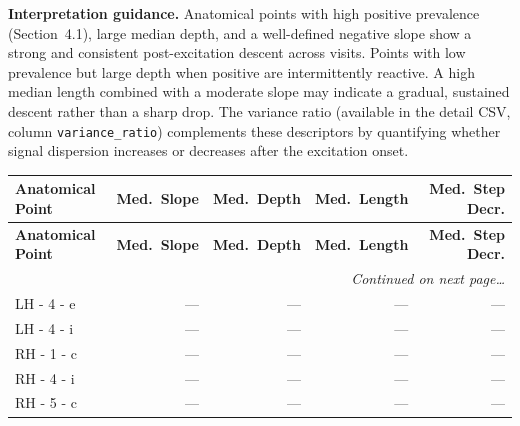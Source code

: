 \documentclass[a4paper,11pt]{article}
\begin{document}
\medskip
\noindent\textbf{Interpretation guidance.}
Anatomical points with high positive prevalence (Section~4.1), large median depth, and a
well-defined negative slope show a strong and consistent post-excitation descent across
visits.
Points with low prevalence but large depth when positive are intermittently reactive.
A high median length combined with a moderate slope may indicate a gradual, sustained
descent rather than a sharp drop.
The variance ratio (available in the detail CSV, column \texttt{variance\_ratio}) complements
these descriptors by quantifying whether signal dispersion increases or decreases after the
excitation onset.

\begin{small}
\begin{longtable}{p{4.5cm}rrrr}
\toprule
\textbf{Anatomical Point} &
\textbf{Med.\ Slope} &
\textbf{Med.\ Depth} &
\textbf{Med.\ Length} &
\textbf{Med.\ Step Decr.} \\
\midrule
\endfirsthead
\toprule
\textbf{Anatomical Point} &
\textbf{Med.\ Slope} &
\textbf{Med.\ Depth} &
\textbf{Med.\ Length} &
\textbf{Med.\ Step Decr.} \\
\midrule
\endhead
\midrule
\multicolumn{5}{r}{\small\emph{Continued on next page\ldots}} \\
\endfoot
\bottomrule
\endlastfoot
LH - 4 - e & --- & --- & --- & --- \\
LH - 4 - i & --- & --- & --- & --- \\
RH - 1 - c & --- & --- & --- & --- \\
RH - 4 - i & --- & --- & --- & --- \\
RH - 5 - c & --- & --- & --- & --- \\
\end{longtable}
\end{small}
\end{document}
